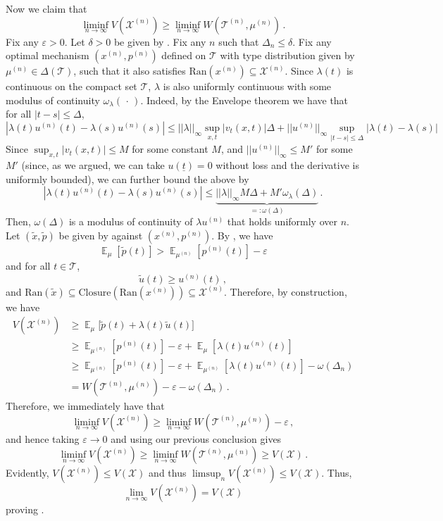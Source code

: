 \documentclass[12pt,letterpaper]{article}
\newenvironment{original}{\color{black}\noindent}{}
\theoremstyle{plain}
\theoremstyle{definition}
\theoremstyle{remark}
\DeclareMathOperator{\E}{\mathds{E}}
\renewcommand{\1}{\mathds{1}}
\newcommand{\X}{\mathcal{X}}
\theoremstyle{definition}
\begin{document}
\begin{original}
Now we claim that
\[\liminf_{n\rightarrow \infty} V(\X^{(n)}) \geq \liminf_{n\rightarrow \infty}W(\mathcal{T}^{(n)}, \mu^{(n)})\,.\]
Fix any $\varepsilon > 0$. Let $\delta > 0$ be given by .  Fix any $n$ such that $\Delta_n \leq \delta$. Fix any optimal mechanism $(x^{(n)}, p^{(n)})$ defined on $\mathcal{T}$ with type distribution given by $\mu^{(n)} \in \Delta(\mathcal{T})$, such that it also satisfies $\text{Ran}(x^{(n)}) \subseteq \X^{(n)}$. Since $\lambda(t)$ is continuous on the compact set $\mathcal{T}$, $\lambda$ is also uniformly continuous with some modulus of continuity $\omega_\lambda(\,\cdot\,)$. Indeed, by the Envelope theorem we have that for all $|t - s| \leq \Delta$,
\[|\lambda(t) u^{(n)}(t) - \lambda(s) u^{(n)}(s)| \leq ||\lambda||_{\infty} \sup_{x, t}|v_t(x, t)|\Delta +  ||u^{(n)}||_\infty\sup_{|t - s| \leq \Delta }|\lambda(t) - \lambda(s)| \]
Since $\sup_{x, t}|v_t(x, t)| \leq M$ for some constant $M$, and $||u^{(n)}||_\infty \leq M'$ for some $M'$ (since, as we argued, we can take $u(\underline{t}) = 0$ without loss and the derivative is uniformly bounded), we can further bound the above by
\[|\lambda(t) u^{(n)}(t) - \lambda(s) u^{(n)}(s)| \leq \underbrace{||\lambda||_{\infty} M \Delta +  M' \omega_\lambda(\Delta)}_{=:\omega(\Delta)}\,.\]
Then, $\omega(\Delta)$ is a modulus of continuity of $\lambda u^{(n)}$ that holds uniformly over $n$. Let $(\tilde{x}, \tilde{p})$ be given by  against $(x^{(n)}, p^{(n)})$.
 By , we have
\[\E_{\mu}[\tilde{p}(t)] > \E_{\mu^{(n)}}[p^{(n)}(t)] - \varepsilon\]
and for all $t \in \mathcal{T}$,
\[\tilde{u}(t) \geq u^{(n)}(t)\,,\]
and $\text{Ran}(\tilde{x}) \subseteq \text{Closure}(\text{Ran}(x^{(n)})) \subseteq \X^{(n)}$. Therefore, by construction, we have
\begin{align*}
    V(\X^{(n)}) &\geq \E_{\mu}\big[\tilde{p}(t) + \lambda(t) \tilde{u}(t)\big]\\
    &\geq  \E_{\mu^{(n)}}[p^{(n)}(t)] - \varepsilon + \E_{\mu}[\lambda(t) u^{(n)}(t)]\\
      &\geq  \E_{\mu^{(n)}}[p^{(n)}(t)] - \varepsilon + \E_{\mu^{(n)}}[\lambda(t) u^{(n)}(t)] - \omega(\Delta_n)\\
        &=  W(\mathcal{T}^{(n)}, \mu^{(n)})- \varepsilon - \omega(\Delta_n)\,.
\end{align*}
Therefore, we immediately have that
\[ \liminf_{n\rightarrow \infty} V(\X^{(n)}) \geq \liminf_{n\rightarrow \infty}W(\mathcal{T}^{(n)}, \mu^{(n)})- \varepsilon\,,\]
and hence taking $\varepsilon \rightarrow 0$ and using our previous conclusion gives
\[\liminf_{n\rightarrow \infty} V(\X^{(n)}) \geq \liminf_{n\rightarrow \infty}W(\mathcal{T}^{(n)}, \mu^{(n)}) \geq V(\X)\,.\]
Evidently, $V(\X^{(n)}) \leq V(\X)$ and thus $\limsup_{n} V(\X^{(n)}) \leq V(\X)$. Thus,
\[\lim_{n \rightarrow \infty} V(\X^{(n)}) = V(\X)\]
proving .
\end{original}
\end{document}
